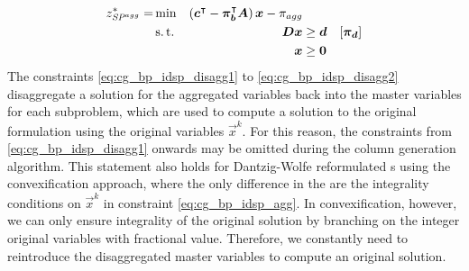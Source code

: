 \begin{equation}
\begin{aligned}
z^*_\SP{agg} = &\min & \left( \vec{c}\transpose - \vec{\pi}_\vec{b}\transpose \mat{A} \right) \vec{x} - \pi_{agg} & & \\
&\st & \mat{D} \vec{x} & \geq \vec{d} & \left[\vec{\pi}_\vec{d}\right] \\
&& \vec{x} & \geq \vec{0}
\end{aligned}
\end{equation}
The constraints \eqref{eq:cg_bp_idsp_disagg1} to \eqref{eq:cg_bp_idsp_disagg2} disaggregate a solution for the aggregated variables back into the master variables for each subproblem, which are used to compute a solution to the original formulation using the original variables $\vec{x}^k$. For this reason, the constraints from \eqref{eq:cg_bp_idsp_disagg1} onwards may be omitted during the column generation algorithm. This statement also holds for Dantzig-Wolfe reformulated \IP{}s using the convexification approach, where the only difference in the \MP{} are the integrality conditions on $\vec{x}^k$ in constraint \eqref{eq:cg_bp_idsp_agg}. In convexification, however, we can only ensure integrality of the original solution by branching on the integer original variables with fractional value. Therefore, we constantly need to reintroduce the disaggregated master variables to compute an original solution.


